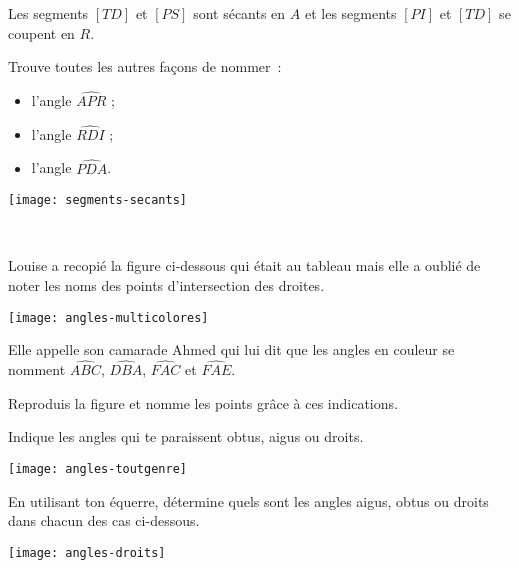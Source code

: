 \begin{exercice}
Les segments $[TD]$ et $[PS]$ sont sécants en $A$ et les segments $[PI]$ et $[TD]$ se coupent en $R$.

Trouve toutes les autres façons de nommer : \\[0.5em]
\begin{minipage}[c]{0.2\textwidth}
\begin{itemize}
 \item l'angle $\widehat{APR}$ ;
 \item l'angle $\widehat{RDI}$ ;
 \item l'angle $\widehat{PDA}$.
 \end{itemize}
 \end{minipage} \hfill%
  \begin{minipage}[c]{0.4\textwidth}
  \texttt{[image: segments-secants]}
  \end{minipage} \\
\end{exercice}  


\begin{exercice}
Louise a recopié la figure ci‑dessous qui était au tableau mais elle a oublié de noter les noms des points d'intersection des droites. 
 \begin{center} \texttt{[image: angles-multicolores]}  \end{center}
Elle appelle son camarade Ahmed qui lui dit que les angles en couleur se nomment $\widehat{ABC}$, $\widehat{DBA}$, $\widehat{FAC}$ et $\widehat{FAE}$.

Reproduis la figure et nomme les points grâce à ces indications.
\end{exercice}  





\begin{exercice}
Indique les angles qui te paraissent obtus, aigus ou droits.
 \begin{center} \texttt{[image: angles-toutgenre]}  \end{center}
\end{exercice}


\begin{exercice}
En utilisant ton équerre, détermine quels sont les angles aigus, obtus ou droits dans chacun des cas ci-dessous.
 \begin{center} \texttt{[image: angles-droits]}  \end{center}
\end{exercice}


